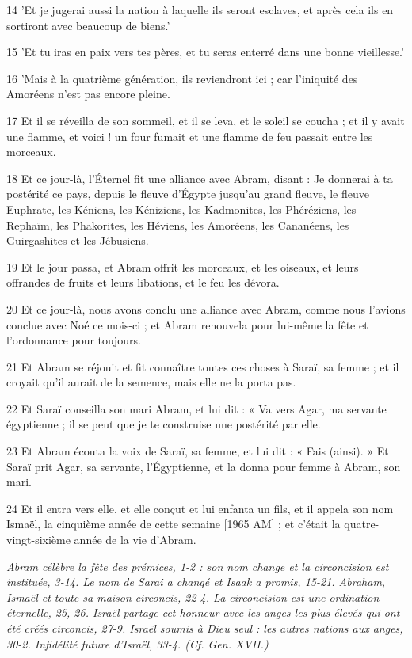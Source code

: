 \par 14 'Et je jugerai aussi la nation à laquelle ils seront esclaves, et après cela ils en sortiront avec beaucoup de biens.'
\par 15 'Et tu iras en paix vers tes pères, et tu seras enterré dans une bonne vieillesse.'
\par 16 'Mais à la quatrième génération, ils reviendront ici ; car l'iniquité des Amoréens n'est pas encore pleine.
\par 17 Et il se réveilla de son sommeil, et il se leva, et le soleil se coucha ; et il y avait une flamme, et voici ! un four fumait et une flamme de feu passait entre les morceaux.
\par 18 Et ce jour-là, l'Éternel fit une alliance avec Abram, disant : Je donnerai à ta postérité ce pays, depuis le fleuve d'Égypte jusqu'au grand fleuve, le fleuve Euphrate, les Kéniens, les Kéniziens, les Kadmonites, les Phéréziens, les Rephaïm, les Phakorites, les Héviens, les Amoréens, les Cananéens, les Guirgashites et les Jébusiens.
\par 19 Et le jour passa, et Abram offrit les morceaux, et les oiseaux, et leurs offrandes de fruits et leurs libations, et le feu les dévora.
\par 20 Et ce jour-là, nous avons conclu une alliance avec Abram, comme nous l'avions conclue avec Noé ce mois-ci ; et Abram renouvela pour lui-même la fête et l'ordonnance pour toujours.
\par 21 Et Abram se réjouit et fit connaître toutes ces choses à Saraï, sa femme ; et il croyait qu'il aurait de la semence, mais elle ne la porta pas.
\par 22 Et Saraï conseilla son mari Abram, et lui dit : « Va vers Agar, ma servante égyptienne ; il se peut que je te construise une postérité par elle.
\par 23 Et Abram écouta la voix de Saraï, sa femme, et lui dit : « Fais (ainsi). » Et Saraï prit Agar, sa servante, l'Égyptienne, et la donna pour femme à Abram, son mari.
\par 24 Et il entra vers elle, et elle conçut et lui enfanta un fils, et il appela son nom Ismaël, la cinquième année de cette semaine [1965 AM] ; et c'était la quatre-vingt-sixième année de la vie d'Abram.


\par \textit{Abram célèbre la fête des prémices, 1-2 : son nom change et la circoncision est instituée, 3-14. Le nom de Sarai a changé et Isaak a promis, 15-21. Abraham, Ismaël et toute sa maison circoncis, 22-4. La circoncision est une ordination éternelle, 25, 26. Israël partage cet honneur avec les anges les plus élevés qui ont été créés circoncis, 27-9. Israël soumis à Dieu seul : les autres nations aux anges, 30-2. Infidélité future d'Israël, 33-4. (Cf. Gen. XVII.)}

